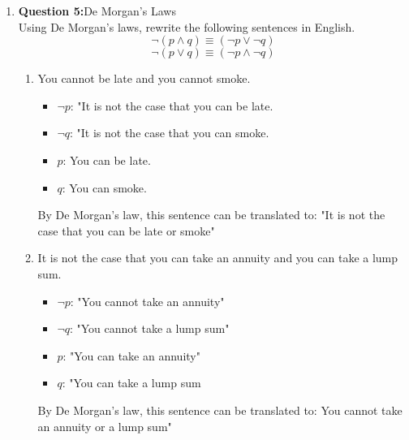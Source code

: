 \documentclass[11pt]{article}
\begin{document}
\begin{enumerate}
\begin{enumerate}[label=(\alph*)]
\end{enumerate}
\item
\textbf{Question 5:}De Morgan's Laws\\
Using De Morgan's laws, rewrite the following sentences in English.\\
\begin{equation}
 \lnot(p \wedge q) \equiv (\lnot p \vee \lnot q)
\end{equation}
\begin{equation}
\lnot(p \vee q) \equiv (\lnot p \wedge \lnot q) 
\end{equation}
\begin{enumerate}[label=(\alph*)]
\item
You cannot be late and you cannot smoke. \\
\begin{itemize}

\item 
$\lnot p$: "It is not the case that you can be late.
\item 
$\lnot q$: "It is not the case that you can smoke.
\item 
$p$: You can be late.
\item 
$q$: You can smoke.
\end{itemize}
By De Morgan's law, this sentence can be translated to: "It is not the case that you can be late or smoke" \\
\item 
It is not the case that you can take an annuity and you can take a lump sum. \\
\begin{itemize}
\item
$\lnot p$: "You cannot take an annuity"
\item 
$\lnot q$: "You cannot take a lump sum"
\item 
$p$: "You can take an annuity"
\item 
$q$: "You can take a lump sum
\end{itemize}
By De Morgan's law, this sentence can be translated to: You cannot take an annuity or a lump sum"
\end{enumerate}


\end{enumerate}
\end{document}

